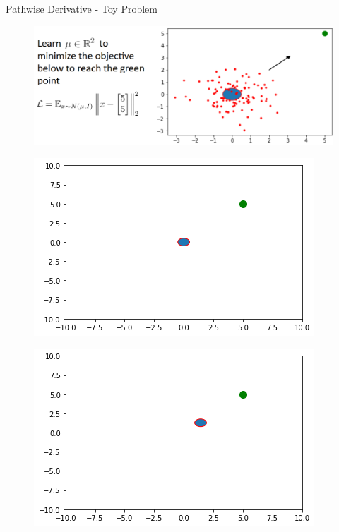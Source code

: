 \begin{frame}[allowframebreaks]{Pathwise Derivative - Toy Problem}
\begin{figure}
		\centering
		\includegraphics[height=0.9\textheight, width=\textwidth, keepaspectratio]{images/vae/toy-problem-1.png}
\end{figure}

\framebreak

\begin{figure}
		\centering
		\includegraphics[height=0.8\textheight, width=\textwidth, keepaspectratio]{images/vae/toy-problem-2.png}
\end{figure}

\framebreak

\begin{figure}
		\centering
		\includegraphics[height=0.8\textheight, width=\textwidth, keepaspectratio]{images/vae/toy-problem-3.png}
\end{figure}


\end{frame}
